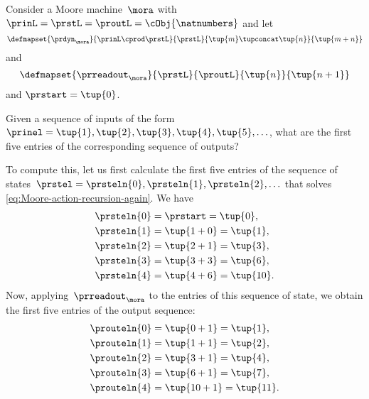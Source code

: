 \begin{example}
    \label{exa:moore-standard-action}
    Consider a Moore machine~$\mora$ with~$\prinL = \prstL = \proutL = \cObj{\natnumbers}$ and let
    \begin{equation}
        \defmapset{
            \prdyn_\mora
        }{
            \prinL \cprod \prstL
        }{
            \prstL
        }{
            \tup{m} \tupconcat \tup{n}
        }{
            \tup{m + n}
        }
    \end{equation}
    and
    \begin{equation}
        \defmapset{
            \prreadout_\mora
        }{
            \prstL
        }{
            \proutL
        }{
            \tup{n}
        }{
            \tup{n+1}
        }
    \end{equation}
    and $\prstart = \tup{0}$.

    Given a sequence of inputs of the form~$\prinel = \tup{1}, \tup{2}, \tup{3}, \tup{4}, \tup{5}, \ldots$, what are the first five entries of the corresponding sequence of outputs?

    To compute this, let us first calculate the first five entries of the sequence of states~$\prstel = \prsteln{0}, \prsteln{1}, \prsteln{2}, \ldots$ that solves \cref{eq:Moore-action-recursion-again}.
    We have
    \begin{align}
        \prsteln{0} & = \prstart = \tup{0}, \\
        \prsteln{1} & = \tup{1 + 0} = \tup{1}, \\
        \prsteln{2} & = \tup{2 + 1} = \tup{3}, \\
        \prsteln{3} & = \tup{3 + 3} = \tup{6}, \\
        \prsteln{4} & = \tup{4 + 6} = \tup{10}.
    \end{align}
    Now, applying~$\prreadout_\mora$ to the entries of this sequence of state, we obtain the first five entries of the output sequence:
    \begin{align}
        \prouteln{0} & = \tup{0 + 1} = \tup{1}, \\
        \prouteln{1} & = \tup{1 + 1} = \tup{2}, \\
        \prouteln{2} & = \tup{3 + 1} = \tup{4}, \\
        \prouteln{3} & = \tup{6 + 1} = \tup{7}, \\
        \prouteln{4} & = \tup{10 + 1} = \tup{11}.
    \end{align}
\end{example}

